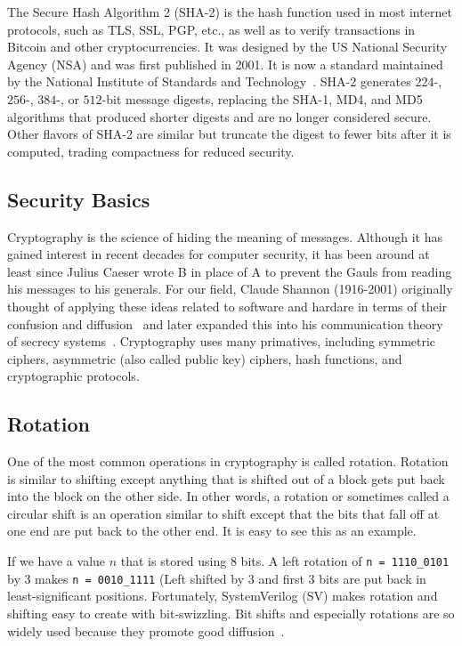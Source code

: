 \documentclass{article}
\begin{document}
The Secure Hash Algorithm 2 (SHA-2) is the hash function used in most
internet protocols, such as TLS, SSL, PGP, etc., as well as to verify
transactions in Bitcoin and other cryptocurrencies. It was designed by
the US National Security Agency (NSA) and was first published in
2001. It is now a standard maintained by the National Institute of
Standards and Technology~\cite{1250396}.
SHA-2 generates $224$-, $256$-, $384$-, or $512$-bit message digests,
replacing the SHA-1, MD4, and MD5 algorithms that produced shorter
digests and are no longer considered secure. 
Other flavors of SHA-2 are similar but truncate the digest to
fewer bits after it is computed, trading compactness for reduced
security. 

\subsection{Security Basics}

Cryptography is the science of hiding the meaning of
messages. Although it has gained interest in recent decades for
computer security, it has been around at least since Julius Caeser
wrote B in place of A to prevent the Gauls from reading his messages
to his generals.
For our field, Claude Shannon (1916-2001) originally thought of
applying these ideas related to software and hardare in terms
of their confusion and diffusion~\cite{shannon1} and later expanded this
into his communication theory of secrecy systems~\cite{6769090}.
Cryptography uses many primatives, including symmetric ciphers,
asymmetric (also called public key) ciphers, hash functions, and
cryptographic protocols.


\subsection{Rotation}
\label{swizzle.sec}

One of the most common operations in cryptography is called rotation.
Rotation is similar to shifting except anything that is shifted out of
a block gets put back into the block on the other side.  In other
words, a rotation or sometimes called a circular shift is an operation
similar to shift except that the bits that fall off at one end are put
back to the other end.  It is easy to see this as an example.

If we have a value $n$ that is stored using $8$ bits.
A left rotation of \verb!n = 1110_0101! by $3$ makes
\verb!n = 0010_1111! (Left shifted by 3 and first 3 bits are put back
in least-significant positions.  Fortunately, SystemVerilog (SV) makes
rotation and shifting easy to create with bit-swizzling.
Bit shifts and especially rotations are so widely used because they
promote good diffusion~\cite{6769090}.
\end{document}
